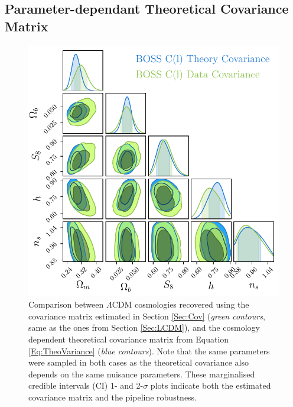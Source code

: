\subsection{Parameter-dependant Theoretical Covariance Matrix}
\begin{figure}
\begin{center}
\includegraphics[scale=0.75]{BOSS-FIGS/theoryCovContours.pdf}
\caption[Comparison between $\Lambda$CDM cosmologies recovered using the covariance matrix estimated in Section \ref{Sec:Cov}and the cosmology dependent theoretical covariance matrix from Equation \eqref{Eq:TheoVariance}.]{Comparison between $\Lambda$CDM cosmologies recovered using the covariance matrix estimated in Section \ref{Sec:Cov} (\textit{green contours}, same as the ones from Section \ref{Sec:LCDM}), and the cosmology dependent theoretical covariance matrix from Equation \eqref{Eq:TheoVariance} (\textit{blue contours}). Note that the same parameters were sampled in both cases as the theoretical covariance also depends on the same nuisance parameters. These marginalised credible intervals (CI) 1- and 2-$\sigma$ plots indicate both the estimated covariance matrix and the \uclcl pipeline robustness.}
\label{fig:TheoryCovTriangle}
\end{center}
\end{figure}

